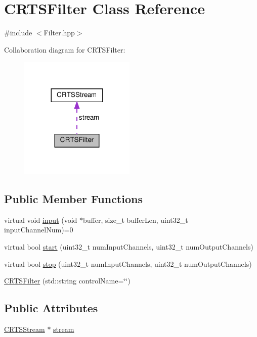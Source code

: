 \hypertarget{classCRTSFilter}{}\section{C\+R\+T\+S\+Filter Class Reference}
\label{classCRTSFilter}


{\ttfamily \#include $<$Filter.\+hpp$>$}



Collaboration diagram for C\+R\+T\+S\+Filter\+:
\nopagebreak
\begin{figure}[H]
\begin{center}
\leavevmode
\includegraphics[width=156pt]{classCRTSFilter__coll__graph}
\end{center}
\end{figure}
\subsection*{Public Member Functions}
\begin{DoxyCompactItemize}
\item 
virtual void \hyperlink{classCRTSFilter_ab75eb3db5914c0d6b3781439d46b2301}{input} (void $\ast$buffer, size\+\_\+t buffer\+Len, uint32\+\_\+t input\+Channel\+Num)=0
\item 
virtual bool \hyperlink{classCRTSFilter_a15a3e99b38a67fd40559776d468b95fa}{start} (uint32\+\_\+t num\+Input\+Channels, uint32\+\_\+t num\+Output\+Channels)
\item 
virtual bool \hyperlink{classCRTSFilter_a934e38c5cd6bd82b309166180f664f0c}{stop} (uint32\+\_\+t num\+Input\+Channels, uint32\+\_\+t num\+Output\+Channels)
\item 
\hyperlink{classCRTSFilter_a2d907e8b7d986f35a5cb31171f7d683f}{C\+R\+T\+S\+Filter} (std\+::string control\+Name=\char`\"{}\char`\"{})
\end{DoxyCompactItemize}
\subsection*{Public Attributes}
\begin{DoxyCompactItemize}
\item 
\hyperlink{classCRTSStream}{C\+R\+T\+S\+Stream} $\ast$ \hyperlink{classCRTSFilter_aa6986d6a10ed56ea4af4ebcf41337e73}{stream}
\end{DoxyCompactItemize}
